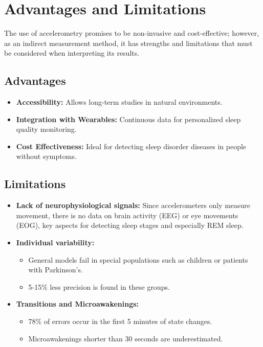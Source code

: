 \documentclass[conference]{IEEEtran}
\begin{document}
\section{Advantages and Limitations}

The use of accelerometry promises to be non-invasive and cost-effective; however, as an indirect measurement method, it has strengths and limitations that must be considered when interpreting its results.

\subsection{Advantages}

\begin{itemize}
	\item \textbf{Accessibility:} Allows long-term studies in natural environments.
	\item \textbf{Integration with Wearables:} Continuous data for personalized sleep quality monitoring.
    \item \textbf{Cost Effectiveness:} Ideal for detecting sleep disorder diseases in people without symptoms.
\end{itemize}

\subsection{Limitations}

\begin{itemize}
	\item \textbf{Lack of neurophysiological signals:} Since accelerometers only measure movement, there is no data on brain activity (EEG) or eye movements (EOG), key aspects for detecting sleep stages and especially REM sleep.
	\item \textbf{Individual variability:} 
            \begin{itemize}
		      \item General models fail in special populations such as children or patients with Parkinson's.
		      \item 5-15\% less precision is found in these groups.
	      \end{itemize}
    \item \textbf{Transitions and Microawakenings:} 
            \begin{itemize}
		      \item 78\% of errors occur in the first 5 minutes of state changes.
		      \item Microawakenings shorter than 30 seconds are underestimated.
	      \end{itemize}
\end{itemize}
\end{document}
